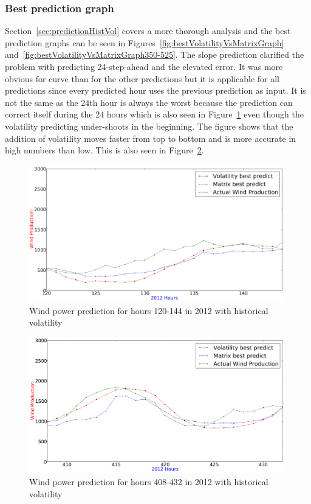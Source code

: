 \subsubsection{Best prediction graph}
Section~\ref{sec:predictionHistVol} covers a more thorough analysis and the best prediction graphs can be seen in Figures~\ref{fig:bestVolatilityVsMatrixGraph} and~\ref{fig:bestVolatilityVsMatrixGraph350-525}. The slope prediction clarified the problem with predicting 24-step-ahead and the elevated error. It was more obvious for curve than for the other predictions but it is applicable for all predictions since every predicted hour uses the previous prediction as input. It is not the same as the 24th hour is always the worst because the prediction can correct itself during the 24 hours which is also seen in Figure~\ref{fig:bestVolatility120to144} even though the volatility predicting under-shoots in the beginning. The figure shows that the addition of volatility moves faster from top to bottom and is more accurate in high numbers than low.
This is also seen in Figure~\ref{fig:bestVolatility408to432}.

\begin{figure}[ht!]
\centering
\includegraphics[width=0.99\textwidth]{billeder/bestVolatility120to144.png}
\caption{Wind power prediction for hours 120-144 in 2012 with historical volatility}
\label{fig:bestVolatility120to144}
\end{figure} 

\begin{figure}[ht!]
\centering
\includegraphics[width=0.99\textwidth]{billeder/bestVolatility408to432.png}
\caption{Wind power prediction for hours 408-432 in 2012 with historical volatility}
\label{fig:bestVolatility408to432}
\end{figure} 

